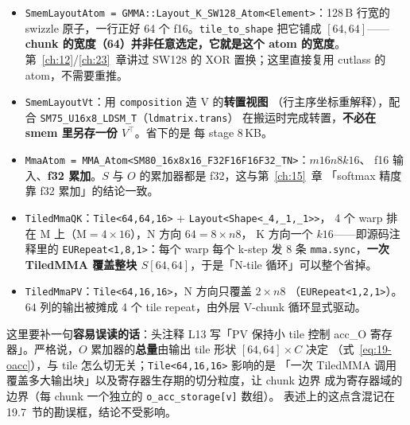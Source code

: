 \begin{itemize}[itemsep=2pt,topsep=2pt]
  \item \texttt{Smem\allowbreak{}Layout\allowbreak{}Atom =\allowbreak{} GMMA::\allowbreak{}Layout\_\allowbreak{}K\_\allowbreak{}SW128\_\allowbreak{}Atom\allowbreak{}<Element>}：128\,B
        行宽的 swizzle 原子，一行正好 64 个 f16。\texttt{tile\_\allowbreak{}to\_\allowbreak{}shape} 把它铺成
        $[64,64]$——\textbf{chunk 的宽度（64）并非任意选定，它就是这个 atom 的宽度}。
        第~\ref{ch:12}/\ref{ch:23}~章讲过 SW128 的 XOR 置换；这里直接复用 cutlass
        的 atom，不需要重推。
  \item \texttt{Smem\allowbreak{}Layout\allowbreak{}Vt}：用 \texttt{composition} 造 V 的\textbf{转置视图}
        （行主序坐标重解释），配合 \texttt{SM75\_}\allowbreak\texttt{U16x8\_}\allowbreak\texttt{LDSM\_T}（\texttt{ldmatrix.}\allowbreak\texttt{trans}）
        在搬运时完成转置，\textbf{不必在 smem 里另存一份 $V^\top$}。省下的是
        每 stage 8\,KB。
  \item \texttt{Mma\allowbreak{}Atom =\allowbreak{} MMA\_\allowbreak{}Atom\allowbreak{}<SM80\_\allowbreak{}16x8x16\_\allowbreak{}F32\allowbreak{}F16\allowbreak{}F16\allowbreak{}F32\_\allowbreak{}TN>}：$m16n8k16$、
        f16 输入、\textbf{f32 累加}。$S$ 与 $O$ 的累加器都是 f32，这与第~\ref{ch:15}~章
        「softmax 精度靠 f32 累加」的结论一致。
  \item \texttt{TiledMmaQK}：\texttt{Tile\allowbreak{}<64,\allowbreak{}64,\allowbreak{}16>} + \texttt{Layout\allowbreak{}<Shape\allowbreak{}<\_\allowbreak{}4,\allowbreak{}\_\allowbreak{}1,\allowbreak{}\_\allowbreak{}1>>}，
        4 个 warp 排在 M 上（$\text{M} = 4 \times 16$），N 方向 $64 = 8 \times n8$，
        K 方向一个 $k16$——即源码注释里的 \texttt{EURepeat\allowbreak{}<1,\allowbreak{}8,\allowbreak{}1>}：每个 warp 每个
        k-step 发 8 条 \texttt{mma.sync}，\textbf{一次 TiledMMA 覆盖整块
        $S[64,64]$}，于是「N-tile 循环」可以整个省掉。
  \item \texttt{TiledMmaPV}：\texttt{Tile\allowbreak{}<64,\allowbreak{}16,\allowbreak{}16>}，N 方向只覆盖 $2 \times n8$
        （\texttt{EURepeat\allowbreak{}<1,\allowbreak{}2,\allowbreak{}1>}）。$64$ 列的输出被摊成 4 个 tile repeat，由外层
        V-chunk 循环显式驱动。
\end{itemize}

这里要补一句\textbf{容易误读的话}：头注释 L13 写「PV 保持小 tile 控制 acc\_O
寄存器」。严格说，$O$ 累加器的\textbf{总量}由输出 tile 形状 $[64,64]\times C$ 决定
（式~\ref{eq:19-oacc}），与 tile 怎么切无关；\texttt{Tile\allowbreak{}<64,\allowbreak{}16,\allowbreak{}16>} 影响的是
「一次 TiledMMA 调用覆盖多大输出块」以及寄存器生存期的切分粒度，让 chunk 边界
成为寄存器域的边界（每 chunk 一个独立的 \texttt{o\_\allowbreak{}acc\_\allowbreak{}storage[v]} 数组）。
表述上的这点含混记在 19.7~节的勘误框，结论不受影响。

